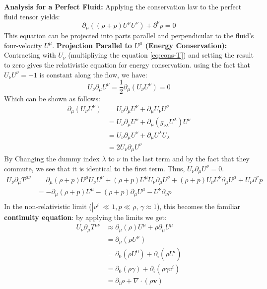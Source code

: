 \documentclass[11pt, a4paper]{report}
\begin{document}
\textbf{Analysis for a Perfect Fluid:}
Applying the conservation law to the perfect fluid tensor yields:
\[
    \partial_\mu ((\rho+p)U^\mu U^\nu) + \partial^\nu p = 0
\]
This equation can be projected into parts parallel and perpendicular to the fluid's four-velocity $U^\mu$.\newline
\newline
\textbf{Projection Parallel to $U^\mu$ (Energy Conservation):} Contracting with $U_\nu$ (multipliying the equation \eqref{eq:cons-T}) and setting the result to zero gives the relativistic equation for energy conservation.
using the fact that $U_\nu U^\nu = -1$ is constant along the flow, we have:
\newline
\begin{equation}
    U_\nu \partial_\mu U^\nu  = \frac{1}{2} \partial_\mu (U_\nu U^\nu) = 0
\end{equation}
Which can be shown as follows:
\begin{equation}
\begin{split}
    \partial_\mu (U_\nu U^\nu) &= U_\nu \partial_\mu U^\nu +  \partial_\mu U_\nu U^\nu \\
                              &= U_\nu \partial_\mu U^\nu + \partial_\mu (g_{\nu\lambda} U^\lambda) U^\nu  \\
                              &= U_\nu \partial_\mu U^\nu +  \partial_\mu U^\lambda U_\lambda \\
                              &= 2 U_\nu \partial_\mu U^\nu
\end{split}
\end{equation}
By Changing the dummy index $\lambda$ to $\nu$ in the last term and by the fact that they commute, we see that it is identical to the first term. Thus, $U_\nu \partial_\mu U^\nu = 0$.
\begin{equation}
\begin{split}
    U_\nu \partial_\mu T^{\mu\nu} &=\partial_\mu (\rho + p) U^\mu U_\nu U^\nu + (\rho + p) U^\mu U_\nu \partial_\mu U^\nu + (\rho + p) U_\nu U^\nu \partial_\mu U^\mu + U_\nu \partial^\nu p\\
    &= -\partial_\mu (\rho +p) U^\mu -(\rho + p) \partial_\mu U^\mu - U^\nu \partial_\nu p \\
\end{split}
\end{equation}
In the non-relativistic limit ($|v^i| \ll 1, p \ll \rho$, $\gamma \approx 1$), this becomes the familiar \textbf{continuity equation}:
by applying the limits we get:
\begin{equation}
\begin{split}
    U_\nu \partial_\mu T^{\mu\nu} &\approx \partial_\mu (\rho) U^\mu + \rho \partial_\mu U^\mu \\
    &= \partial_\mu (\rho U^\mu)   \\
    &= \partial_{0} (\rho U^{0}) + \partial_i (\rho U^i) \\
    &= \partial_{0} (\rho \gamma) + \partial_i (\rho \gamma v^i) \\
    &= \partial_t \rho + \nabla \cdot (\rho \mathbf{v}) \\
\end{split}
\end{equation}
\end{document}
